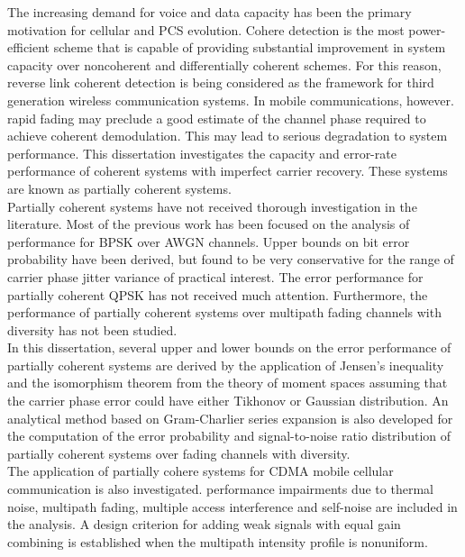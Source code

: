 The increasing demand for voice and data capacity has been the primary motivation for cellular and PCS evolution.
Cohere detection is the most power-efficient scheme that is capable of providing substantial improvement in system capacity over noncoherent and differentially coherent schemes.
For this reason, reverse link coherent detection is being considered as the framework for third generation wireless communication systems.
In mobile communications, however. rapid fading may preclude a good estimate of the channel phase required to achieve coherent demodulation.
This may lead to serious degradation to system performance. 
This dissertation investigates the capacity and error-rate performance of coherent systems with imperfect carrier recovery.
These systems are known as partially coherent systems.\\

Partially coherent systems have not received thorough investigation in the literature.
Most of the previous work has been focused on the analysis of performance for BPSK over AWGN channels.
Upper bounds on bit error probability have been derived, but found to be very conservative for the range of carrier phase jitter variance of practical interest.
The error performance for partially coherent QPSK has not received much attention.
Furthermore, the performance of partially coherent systems over multipath fading channels with diversity has not been studied.\\

In this dissertation, several upper and lower bounds on the error performance of partially coherent systems are derived by the application of Jensen's inequality and the isomorphism theorem from the theory of moment spaces assuming that the carrier phase error could have either Tikhonov or Gaussian distribution.
An analytical method based on Gram-Charlier series expansion is also developed for the computation of the error probability and signal-to-noise ratio distribution of partially coherent systems over fading channels with diversity.\\

The application of partially cohere systems for CDMA mobile cellular communication is also investigated.
performance impairments due to thermal noise, multipath fading, multiple access interference and self-noise are included in the analysis.
A design criterion for adding weak signals with equal gain combining is established when the multipath intensity profile is nonuniform.